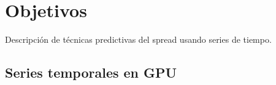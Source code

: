 \section{Objetivos}
Descripción de técnicas predictivas del spread usando series de tiempo.

\subsection{Series temporales en GPU}
